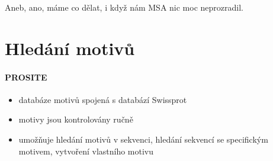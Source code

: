 \documentclass[DIV=8]{scrreprt}
\begin{document}
Aneb, ano, máme co dělat, i když nám MSA nic moc neprozradil.

\section{Hledání motivů} \label{Hledání motivů}


\paragraph{PROSITE}
\begin{itemize}[nosep]
    \item databáze motivů spojená s databází Swissprot
    \item motivy jsou kontrolovány ručně
    \item umožňuje hledání motivů v sekvenci, hledání sekvencí se specifickým motivem, vytvoření vlastního motivu
\end{itemize}
\end{document}
